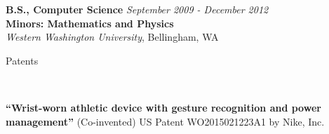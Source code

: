 \documentclass[9pt]{article}
\newenvironment{changemargin}[2]{%
  \begin{list}{}{%
    \setlength{\topsep}{0pt}%
    \setlength{\leftmargin}{#1}%
    \setlength{\rightmargin}{#2}%
    \setlength{\listparindent}{\parindent}%
    \setlength{\itemindent}{\parindent}%
    \setlength{\parsep}{\parskip}%
  }%
  \item[]}{\end{list}
}
\newcommand{\lineover}{
    \begin{changemargin}{-0.05in}{-0.05in}
        \vspace*{-8pt}
        \hrulefill \\
        \vspace*{-2pt}
    \end{changemargin}
}
\newcommand{\header}[1]{
    \begin{changemargin}{-0.5in}{-0.5in}
        {\large #1}\\
        \lineover
    \end{changemargin}
}
\newenvironment{body} {
    \vspace*{-16pt}
    \begin{changemargin}{-0.20in}{-0.5in}
  }
    {\end{changemargin}
}
\begin{document}
\begin{body}
    \vspace{14pt}

    \textbf{B.S., Computer Science}{} \hfill \emph{September 2009 - December 2012}{} \\
    \textbf{Minors: Mathematics and Physics}\\
    \emph{Western Washington University}, Bellingham, WA{} \\
    \medskip


\end{body}

\smallskip



\header{Patents}
\begin{body}
    \vspace{14pt}
    \textbf{``Wrist-worn athletic device with gesture recognition and power management''} (Co-invented) US Patent WO2015021223A1 by Nike, Inc.
\end{body}

\smallskip


\end{document}

